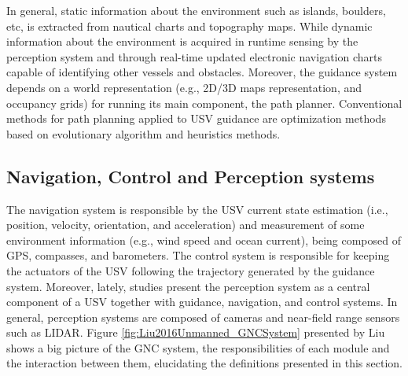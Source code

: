     In general, static information about the environment such as islands, boulders, etc, is extracted from nautical charts and topography maps. While dynamic information about the environment is acquired in runtime sensing by the perception system and through real-time updated electronic navigation charts capable of identifying other vessels and obstacles. Moreover, the guidance system depends on a world representation (e.g., 2D/3D maps representation, and occupancy grids) for running its main component, the path planner. Conventional methods for path planning applied to \ac{USV} guidance are optimization methods based on evolutionary algorithm and heuristics methods.

    \subsection{Navigation, Control and Perception systems}
    
    The navigation system is responsible by the \ac{USV} current state estimation (i.e., position, velocity, orientation, and acceleration) and measurement of some environment information (e.g., wind speed and ocean current), being composed of \acs{GPS}, compasses, and barometers. 
    The control system is responsible for keeping the actuators of the \ac{USV} following the trajectory generated by the guidance system. 
    Moreover, lately, studies present the perception system as a central component of a \ac{USV} together with guidance, navigation, and control systems. 
    In general, perception systems are composed of cameras and near-field range sensors such as \ac{LIDAR}.
    Figure \ref{fig:Liu2016Unmanned_GNCSystem} presented by Liu \etal~\cite{Liu2016Unmanned} shows a big picture of the \ac{GNC} system, the responsibilities of each module and the interaction between them, elucidating the definitions presented in this section. 
    

